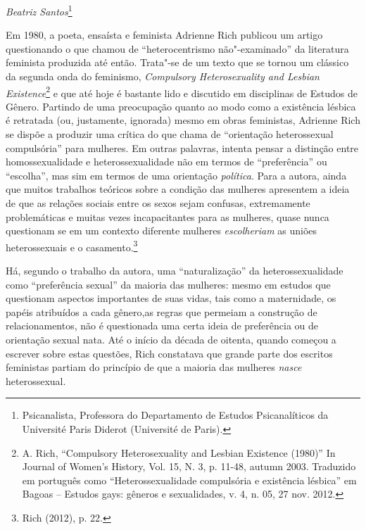 \begin{flushright}
\emph{Beatriz Santos}\footnote{Psicanalista, Professora do Departamento de Estudos Psicanalíticos da Université Paris Diderot (Université de Paris).}
\end{flushright}


Em 1980, a poeta, ensaísta e feminista Adrienne Rich publicou um artigo
questionando o que chamou de ``heterocentrismo não"-examinado'' da
literatura feminista produzida até então. Trata"-se de um texto que se
tornou um clássico da segunda onda do feminismo, \emph{Compulsory
Heterosexuality and Lesbian Existence}\footnote{A. Rich, ``Compulsory
  Heterosexuality and Lesbian Existence (1980)'' In Journal of Women's
  History, Vol. 15, N. 3, p. 11-48, autumn 2003.
  Traduzido em português como ``Heterossexualidade compulsória e
  existência lésbica'' em Bagoas -- Estudos gays: gêneros e sexualidades,
  v. 4, n. 05, 27 nov. 2012.} e que até hoje é bastante lido e discutido
em disciplinas de Estudos de Gênero. Partindo de uma preocupação quanto
ao modo como a existência lésbica é retratada (ou, justamente, ignorada)
mesmo em obras feministas, Adrienne Rich se dispõe a produzir uma
crítica do que chama de ``orientação heterossexual compulsória'' para
mulheres. Em outras palavras, intenta pensar a distinção entre
homossexualidade e heterossexualidade não em termos de ``preferência''
ou ``escolha'', mas sim em termos de uma orientação \emph{política}.
Para a autora, ainda que muitos trabalhos teóricos sobre a condição das
mulheres apresentem a ideia de que as relações sociais entre os sexos
sejam confusas, extremamente problemáticas e muitas vezes incapacitantes
para as mulheres, quase nunca questionam se em um contexto diferente
mulheres \emph{escolheriam} as uniões heterossexuais e o
casamento.\footnote{Rich (2012), p. 22.}

Há, segundo o trabalho da autora, uma ``naturalização'' da
heterossexualidade como ``preferência sexual'' da maioria das mulheres:
mesmo em estudos que questionam aspectos importantes de suas vidas, tais
como a maternidade, os papéis atribuídos a cada gênero,as regras que
permeiam a construção de relacionamentos, não é questionada uma certa
ideia de preferência ou de orientação sexual nata. Até o início da
década de oitenta, quando começou a escrever sobre estas questões, Rich
constatava que grande parte dos escritos feministas partiam do princípio
de que a maioria das mulheres \emph{nasce} heterossexual.

